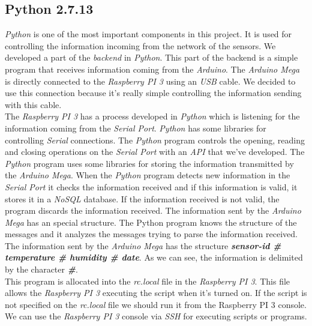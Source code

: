 \subsection{Python 2.7.13}

\textit{Python} is one of the most important components in this project. It is used for controlling the information incoming from the network of the sensors. We developed a part of the \textit{backend} in \textit{Python}. This part of the backend is a simple program that receives information coming from the \textit{Arduino}. The \textit{Arduino Mega} is directly connected to the \textit{Raspberry PI 3} using an \textit{USB} cable. We decided to use this connection because it's really simple controlling the information sending with this cable.\\

The \textit{Raspberry PI 3} has a process developed in \textit{Python} which is listening for the information coming from the \textit{Serial Port}. \textit{Python} has some libraries for controlling \textit{Serial} connections. The \textit{Python} program controls the opening, reading and closing operations on the \textit{Serial Port} with an \textit{API} that we've developed. The \textit{Python} program uses some libraries for storing the information transmitted by the \textit{Arduino Mega}. When the \textit{Python} program detects new information in the \textit{Serial Port} it checks the information received and if this information is valid, it stores it in a \textit{NoSQL} database. If the information received is not valid, the program discards the information received. The information sent by the \textit{Arduino Mega} has an special structure. The Python program knows the structure of the messages and it analyzes the messages trying to parse the information received.\\

The information sent by the \textit{Arduino Mega} has the structure \textit{\textbf{sensor-id \# temperature \# humidity \# date}}. As we can see, the information is delimited by the character \textbf{\textit{\#}}.\\

This program is allocated into the \textit{rc.local} file in the \textit{Raspberry PI 3}. This file allows the \textit{Raspberry PI 3} executing the script when it's turned on. If the script is not specified on the \textit{rc.local} file we should run it from the Raspberry PI 3 console. We can use the \textit{Raspberry PI 3} console via \textit{SSH} for executing scripts or programs.\\

